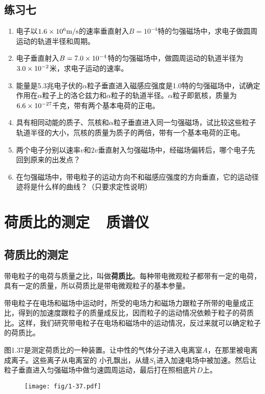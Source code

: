 \subsection*{练习七}
\begin{enumerate}
    \item 电子以$1.6\times10^6\text{m}/\text{s}$的速率垂直射入$B=10^{-4}$特的匀强磁场中，求电子做圆周运动的轨道半径和周期。
    \item 电子垂直射入$B=7.0\times10^{-4}$特的匀强磁场中，做圆周运动的轨道半径为$3.0\times10^{-2}$米，求电子运动的速率。
    \item 能量是5.3兆电子伏的$\alpha$粒子垂直进入磁感应强度是1.0特的匀强磁场中，试确定作用在$\alpha$粒子上的洛仑兹力和$\alpha$粒子的轨道半径。$\alpha$粒子即氦核，质量为$6.6\times10^{-27}$千克，带有两个基本电荷的正电。
    \item 具有相同动能的质子、氘核和$\alpha$粒子垂直进入同一匀强磁场，试比较这些粒子轨道半径的大小，氘核的质量为质子的两倍，带有一个基本电荷的正电。
    \item 两个电子分别以速率$v$和$2v$垂直射入匀强磁场中，经磁场偏转后，哪个电子先回到原来的出发点？
    \item 在匀强磁场中，带电粒子的运动方向不和磁感应强度的方向垂直，它的运动径迹将是什么样的曲线？（只要求定性说明）
\end{enumerate}


\section{荷质比的测定~~质谱仪}
\subsection{荷质比的测定}

带电粒子的电荷与质量之比，叫做\textbf{荷质比}。每种带电微观粒子都带有一定的电荷，具有一定的质量，所以荷质比是带电微观粒子的基本参量。

带电粒子在电场和磁场中运动时，所受的电场力和磁场力跟粒子所带的电量成正比，得到的加速度跟粒子的质量成反比，因而粒子的运动情况依赖于粒子的荷质比。这样，我们研究带电粒子在电场和磁场中的运动情况，反过来就可以确定粒子的荷质比。

图1.37是测定荷质比的一种装置。让中性的气体分子进入电离室$A$，在那里被电离成离子。这些离子从电离室的
小孔飘出，从缝$S_1$进入加速电场中被加速。然后让粒子垂直进入匀强磁场中做匀速圆周运动，最后打在照相底片$D$上。
\begin{figure}[htp]\centering
\texttt{[image: fig/1-37.pdf]}
\caption{}
\end{figure}

